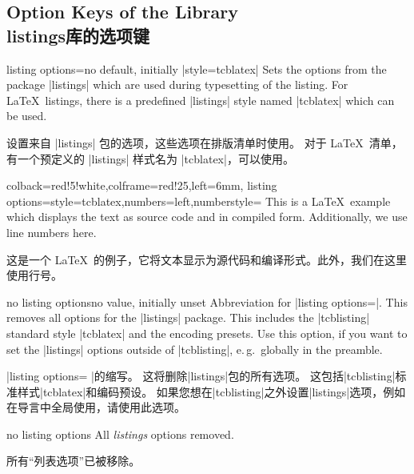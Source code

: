\subsection{Option Keys of the  Library\\listings库的选项键}\label{sec:speclistingkeys}

\begin{docTcbKey}{listing options}{=}{no default, initially |style=tcblatex|}
Sets the options from the package |listings| 
which are used during typesetting of the listing.
For \LaTeX\ listings, there is a predefined |listings| style named |tcblatex|
which can be used.

设置来自 |listings| 包的选项，这些选项在排版清单时使用。 对于 \LaTeX\ 清单，有一个预定义的 |listings| 样式名为 |tcblatex|，可以使用。
\begin{dispExample}
\begin{tcblisting}{colback=red!5!white,colframe=red!25,left=6mm,
listing options={style=tcblatex,numbers=left,numberstyle=\tiny\color{red!75!black}}}
This is a \LaTeX\ example which displays the text as source code
and in compiled form. Additionally, we use line numbers here.

这是一个 \LaTeX\ 的例子，它将文本显示为源代码和编译形式。此外，我们在这里使用行号。
\end{tcblisting}
\end{dispExample}
\end{docTcbKey}

\begin{docTcbKey}{no listing options}{}{no value, initially unset}
Abbreviation for |listing options={}|.
This removes all options for the |listings| package.
This includes the |tcblisting| standard style |tcblatex| and the encoding presets.
Use this option, if you want to set the |listings| options outside of |tcblisting|, e.\,g.\ globally in
the preamble.

|listing options={} |的缩写。 这将删除|listings|包的所有选项。 这包括|tcblisting|标准样式|tcblatex|和编码预设。 如果您想在|tcblisting|之外设置|listings|选项，例如在导言中全局使用，请使用此选项。
\begin{dispExample}
\begin{tcblisting}{no listing options}
All \textit{listings} options removed.

所有“列表选项”已被移除。
\end{tcblisting}
\end{dispExample}
\end{docTcbKey}


